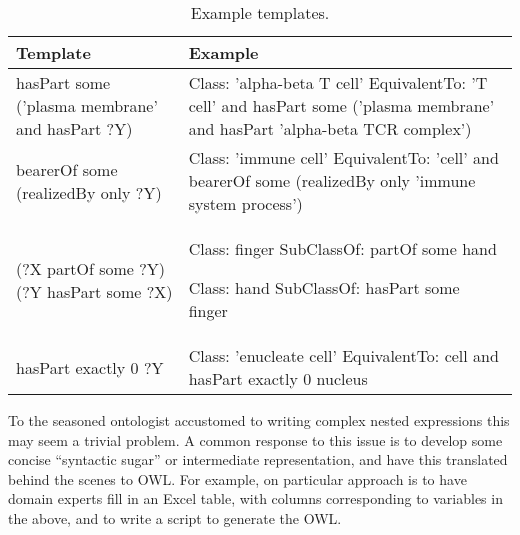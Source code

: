 \documentclass[11pt]{article}
\begin{document}
  \begin{table}
    \begin{tabular}{ | p{7cm} | p{7cm} | }
      \hline 
      \textbf{Template} & \textbf{Example} \\
      \hline

      hasPart some ('plasma membrane' and hasPart ?Y)

      &

      Class: 'alpha-beta T cell'
      EquivalentTo: 'T cell' and 
      hasPart some ('plasma membrane' and hasPart 'alpha-beta TCR complex')

      \\

      \hline

      bearerOf some (realizedBy only ?Y)

      &

      Class: 'immune cell'
      EquivalentTo: 'cell' and bearerOf some (realizedBy only 'immune system process')

      \\

      \hline

      (?X partOf some ?Y) (?Y hasPart some ?X)

      &

      Class: finger
      SubClassOf: partOf some hand

      Class: hand
      SubClassOf: hasPart some finger 
      \\

      \hline

      hasPart exactly 0 ?Y

      &

      Class: 'enucleate cell'
      EquivalentTo: cell and hasPart exactly 0 nucleus

      \\
      \hline
    \end{tabular}
    \caption{Example templates.}
    \label{tab:example-templates}
  \end{table}


To the seasoned ontologist accustomed to writing complex nested
expressions this may seem a trivial problem.  A common response to
this issue is to develop some concise ``syntactic sugar'' or
intermediate representation, and have this translated behind the
scenes to OWL. For example, on particular approach is to have domain
experts fill in an Excel table, with columns corresponding to
variables in the above, and to write a script to generate the OWL.
\end{document}
